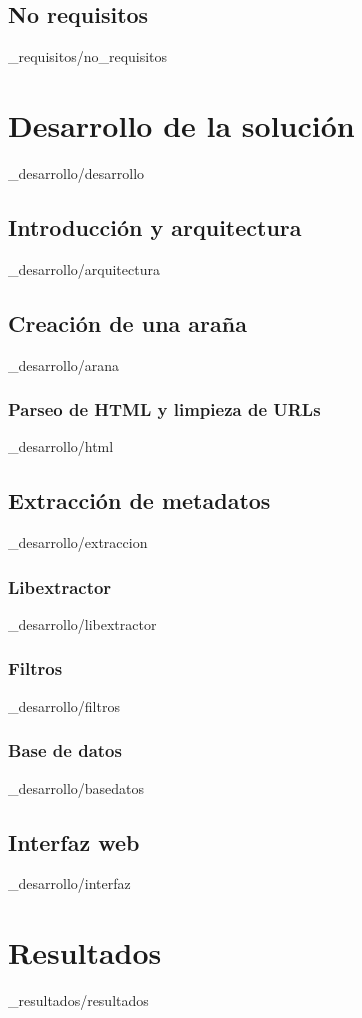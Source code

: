 \documentclass[epsbased,copyright,final,printable,covers,extendedindex,firstnumbered,tfg,gnuplot]{tfgtfmthesisuam}
\begin{document}
  \section{No requisitos\label{SEC:FUNREQUISITOS}}{_requisitos/no_requisitos}

\chapter{Desarrollo de la solución\label{CAP:SOLUCION}}{_desarrollo/desarrollo}
  \section{Introducción y arquitectura\label{SEC:ARQUITECTURA}}{_desarrollo/arquitectura}
  \section{Creación de una araña\label{SEC:ARANA}}{_desarrollo/arana}
    \subsection{Parseo de HTML y limpieza de URLs\label{SS:HTMLPARSER}}{_desarrollo/html}
  \section{Extracción de metadatos\label{SEC:EXTRACION}}{_desarrollo/extraccion}
    \subsection{Libextractor\label{SS:LIBEXTRACTOR}}{_desarrollo/libextractor}
    \subsection{Filtros\label{SS:FILTROS}}{_desarrollo/filtros}
    \subsection{Base de datos\label{SS:BD}}{_desarrollo/basedatos}
  \section{Interfaz web\label{SEC:WUI}}{_desarrollo/interfaz}

\chapter{Resultados\label{CAP:RESULTADOS}}{_resultados/resultados}
\end{document}
